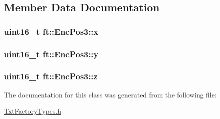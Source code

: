\subsection{Member Data Documentation}
\subsubsection[{\texorpdfstring{x}{x}}]{\setlength{\rightskip}{0pt plus 5cm}uint16\+\_\+t ft\+::\+Enc\+Pos3\+::x}\hypertarget{classft_1_1_enc_pos3_ad03b62372f78ef0a141f4389f8e6c67d}{}\label{classft_1_1_enc_pos3_ad03b62372f78ef0a141f4389f8e6c67d}
\subsubsection[{\texorpdfstring{y}{y}}]{\setlength{\rightskip}{0pt plus 5cm}uint16\+\_\+t ft\+::\+Enc\+Pos3\+::y}\hypertarget{classft_1_1_enc_pos3_a2ed97861702c89ee83bef490c701e2c6}{}\label{classft_1_1_enc_pos3_a2ed97861702c89ee83bef490c701e2c6}
\subsubsection[{\texorpdfstring{z}{z}}]{\setlength{\rightskip}{0pt plus 5cm}uint16\+\_\+t ft\+::\+Enc\+Pos3\+::z}\hypertarget{classft_1_1_enc_pos3_a621ba71369e3cc2fb3461a944ec7d7e1}{}\label{classft_1_1_enc_pos3_a621ba71369e3cc2fb3461a944ec7d7e1}


The documentation for this class was generated from the following file\+:\begin{DoxyCompactItemize}
\item 
\hyperlink{_txt_factory_types_8h}{Txt\+Factory\+Types.\+h}\end{DoxyCompactItemize}
